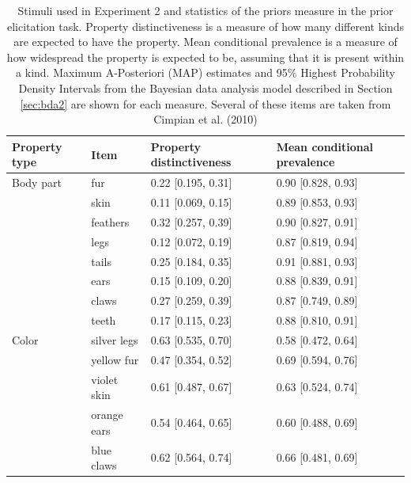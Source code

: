 \documentclass[10pt,letterpaper]{article}
\begin{document}
\begin{table}[h]
\centering
\caption{Stimuli used in Experiment 2 and statistics of the priors measure in the prior elicitation task. 
Property distinctiveness is a measure of how many different kinds are expected to have the property. Mean conditional prevalence is a measure of how widespread the property is expected to be, assuming that it is present within a kind.
Maximum A-Posteriori (MAP) estimates and 95\% Highest Probability Density Intervals from the Bayesian data analysis model described in Section \ref{sec:bda2} are shown for each measure.
Several of these items are taken from Cimpian et al. (2010)}
\label{tab:novelGenericsStimuli}
\begin{tabular}{| l || l | l | l |}
\hline
Property type             & Item          & Property distinctiveness               & Mean conditional prevalence                     \\
\hline \hline
Body part              & fur                & 0.22 {[}0.195, 0.31{]} & 0.90 {[}0.828, 0.93{]} \\
                  & skin               & 0.11 {[}0.069, 0.15{]} & 0.89 {[}0.853, 0.93{]} \\
                  & feathers           & 0.32 {[}0.257, 0.39{]} & 0.90 {[}0.827, 0.91{]} \\
                  & legs               & 0.12 {[}0.072, 0.19{]} & 0.87 {[}0.819, 0.94{]} \\
                  & tails              & 0.25 {[}0.184, 0.35{]} & 0.91 {[}0.881, 0.93{]} \\
                  & ears               & 0.15 {[}0.109, 0.20{]} & 0.88 {[}0.839, 0.91{]} \\
                  & claws              & 0.27 {[}0.259, 0.39{]} & 0.87 {[}0.749, 0.89{]} \\
                  & teeth              & 0.17 {[}0.115, 0.23{]} & 0.88 {[}0.810, 0.91{]} \\
Color            & silver legs        & 0.63 {[}0.535, 0.70{]} & 0.58 {[}0.472, 0.64{]} \\
                 & yellow fur         & 0.47 {[}0.354, 0.52{]} & 0.69 {[}0.594, 0.76{]} \\
                 & violet skin        & 0.61 {[}0.487, 0.67{]} & 0.63 {[}0.524, 0.74{]} \\
                 & orange ears        & 0.54 {[}0.464, 0.65{]} & 0.60 {[}0.488, 0.69{]} \\
                 & blue claws         & 0.62 {[}0.564, 0.74{]} & 0.66 {[}0.481, 0.69{]} \\

\end{tabular}
\end{table}
\end{document}
